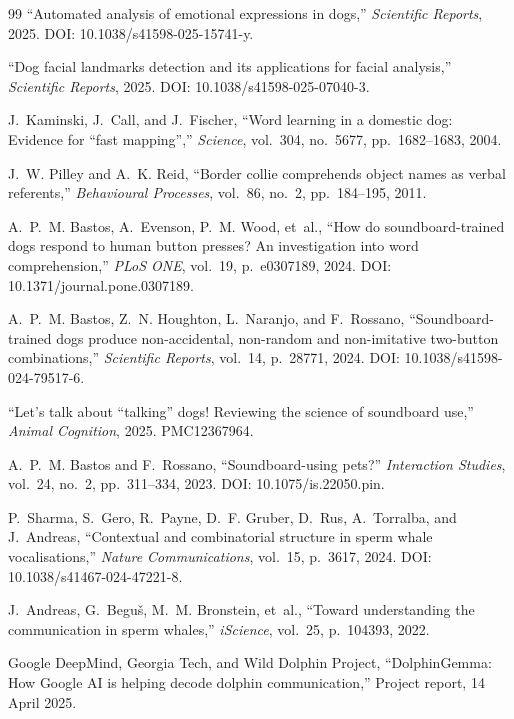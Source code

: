 \begin{thebibliography}{99}
``Automated analysis of emotional expressions in dogs,''
\emph{Scientific Reports}, 2025. DOI: 10.1038/s41598-025-15741-y.

``Dog facial landmarks detection and its applications for facial analysis,''
\emph{Scientific Reports}, 2025. DOI: 10.1038/s41598-025-07040-3.

J.~Kaminski, J.~Call, and J.~Fischer,
``Word learning in a domestic dog: Evidence for ``fast mapping'',''
\emph{Science}, vol.~304, no.~5677, pp.~1682--1683, 2004.

J.~W. Pilley and A.~K. Reid,
``Border collie comprehends object names as verbal referents,''
\emph{Behavioural Processes}, vol.~86, no.~2, pp.~184--195, 2011.

A.~P.~M. Bastos, A.~Evenson, P.~M. Wood, et~al.,
``How do soundboard-trained dogs respond to human button presses? An
investigation into word comprehension,'' \emph{PLoS ONE}, vol.~19,
p.~e0307189, 2024. DOI: 10.1371/journal.pone.0307189.

A.~P.~M. Bastos, Z.~N. Houghton, L.~Naranjo, and F.~Rossano,
``Soundboard-trained dogs produce non-accidental, non-random and non-imitative
two-button combinations,'' \emph{Scientific Reports}, vol.~14, p.~28771, 2024.
DOI: 10.1038/s41598-024-79517-6.

``Let's talk about ``talking'' dogs! Reviewing the science of soundboard
use,'' \emph{Animal Cognition}, 2025. PMC12367964.

A.~P.~M. Bastos and F.~Rossano,
``Soundboard-using pets?'' \emph{Interaction Studies}, vol.~24, no.~2,
pp.~311--334, 2023. DOI: 10.1075/is.22050.pin.

P.~Sharma, S.~Gero, R.~Payne, D.~F. Gruber, D.~Rus, A.~Torralba, and J.~Andreas,
``Contextual and combinatorial structure in sperm whale vocalisations,''
\emph{Nature Communications}, vol.~15, p.~3617, 2024.
DOI: 10.1038/s41467-024-47221-8.

J.~Andreas, G.~Begu\v{s}, M.~M. Bronstein, et~al.,
``Toward understanding the communication in sperm whales,''
\emph{iScience}, vol.~25, p.~104393, 2022.

Google DeepMind, Georgia Tech, and Wild Dolphin Project,
``DolphinGemma: How Google AI is helping decode dolphin communication,''
Project report, 14 April 2025.


\end{thebibliography}

